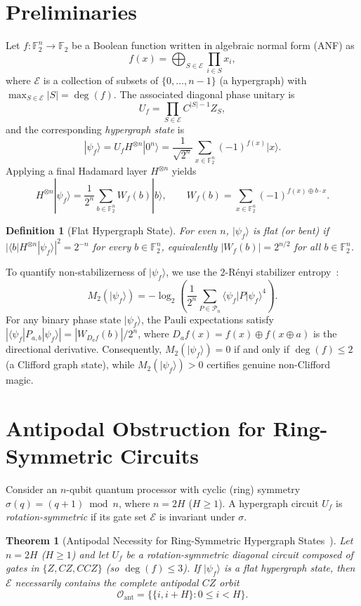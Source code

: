 \documentclass[11pt,a4paper]{article}
\newtheorem{theorem}{Theorem}
\newtheorem{definition}{Definition}
\newcommand{\F}{\mathbb{F}}
\newcommand{\ket}[1]{|#1\rangle}
\newcommand{\bra}[1]{\langle#1|}
\begin{document}
\section{Preliminaries}
Let $f:\F_2^n\to\F_2$ be a Boolean function written in algebraic normal form (ANF) as
\[
  f(x) = \bigoplus_{S \in \mathcal{E}} \prod_{i \in S} x_i,
\]
where $\mathcal{E}$ is a collection of subsets of $\{0, \dots, n-1\}$ (a hypergraph) with $\max_{S \in \mathcal{E}} |S| = \deg(f)$. The associated diagonal phase unitary is
\[
  U_f = \prod_{S \in \mathcal{E}} C^{|S|-1}Z_S,
\]
and the corresponding \emph{hypergraph state} is
\[
  \ket{\psi_f} = U_f H^{\otimes n}\ket{0^n} = \frac{1}{\sqrt{2^n}} \sum_{x \in \F_2^n} (-1)^{f(x)}\ket{x}.
\]
Applying a final Hadamard layer $H^{\otimes n}$ yields
\[
  H^{\otimes n}\ket{\psi_f} = \frac{1}{2^n}\sum_{b \in \F_2^n} W_f(b)\ket{b},
  \qquad
  W_f(b) = \sum_{x \in \F_2^n} (-1)^{f(x) \oplus b\cdot x}.
\]

\begin{definition}[Flat Hypergraph State]
For even $n$, $\ket{\psi_f}$ is \emph{flat} (or \emph{bent}) if $|\bra{b}H^{\otimes n}\ket{\psi_f}|^2 = 2^{-n}$ for every $b \in \F_2^n$, equivalently $|W_f(b)| = 2^{n/2}$ for all $b \in \F_2^n$.
\end{definition}

To quantify non-stabilizerness of $\ket{\psi_f}$, we use the $2$-R\'enyi stabilizer entropy~\cite{Leone2022}:
\[
  M_2(\ket{\psi_f}) = -\log_2\!\left(\frac{1}{2^n}\sum_{P \in \mathcal{P}_n} \bra{\psi_f}P\ket{\psi_f}^4\right).
\]
For any binary phase state $\ket{\psi_f}$, the Pauli expectations satisfy $|\bra{\psi_f}P_{a,b}\ket{\psi_f}| = |W_{D_a f}(b)| / 2^n$, where $D_a f(x) = f(x)\oplus f(x\oplus a)$ is the directional derivative. Consequently, $M_2(\ket{\psi_f}) = 0$ if and only if $\deg(f) \le 2$ (a Clifford graph state), while $M_2(\ket{\psi_f}) > 0$ certifies genuine non-Clifford magic.

\section{Antipodal Obstruction for Ring-Symmetric Circuits}
\label{sec:antipodal}

Consider an $n$-qubit quantum processor with cyclic (ring) symmetry $\sigma(q) = (q+1) \bmod n$, where $n = 2H$ ($H \ge 1$). A hypergraph circuit $U_f$ is \emph{rotation-symmetric} if its gate set $\mathcal{E}$ is invariant under $\sigma$.

\begin{theorem}[Antipodal Necessity for Ring-Symmetric Hypergraph States~\cite{Vono2026Antipodal}]
\label{thm:antipodal}
Let $n = 2H$ ($H \ge 1$) and let $U_f$ be a rotation-symmetric diagonal circuit composed of gates in $\{Z, CZ, CCZ\}$ (so $\deg(f) \le 3$). If $\ket{\psi_f}$ is a flat hypergraph state, then $\mathcal{E}$ necessarily contains the complete antipodal $CZ$ orbit
\[
  \mathcal{O}_{\mathrm{ant}} = \bigl\{\{i, i+H\} : 0 \le i < H\bigr\}.
\]
\end{theorem}
\end{document}
